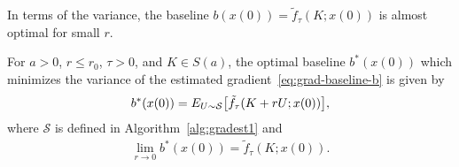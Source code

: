 In terms of the variance, the baseline $b(x(0)) = \tilde f_\tau(K;x(0))$ is almost optimal for small $r$.
\begin{theorem}\label{thm:baseline}
  For $a > 0$, $r \leq r_0$, $\tau > 0$, and $K\in S(a)$,
  the optimal baseline $b^*(x(0))$ which minimizes the variance of the estimated gradient~\eqref{eq:grad-baseline-b} is given by
  \begin{align}
    b^*(x(0)) = E_{U\sim \mathcal{S}}\qty[\tilde f_\tau(K+rU;x(0))],\label{eq:b-star}
  \end{align}
  where $\mathcal{S}$ is defined in Algorithm~\ref{alg:gradest1}
  and
  \begin{align}
    \lim_{r\to 0}b^*(x(0)) = \tilde f_\tau(K;x(0)).\label{eq:limit}
  \end{align}
\end{theorem}
